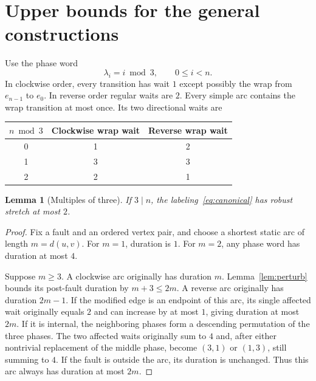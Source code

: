 \documentclass[11pt,a4paper]{article}
\newtheorem{lemma}{Lemma}
\begin{document}
\section{Upper bounds for the general constructions}
Use the phase word
\begin{equation}
 \lambda_i=i\bmod3,\qquad 0\le i<n.\label{eq:canonical}
\end{equation}
In clockwise order, every transition has wait $1$ except possibly the wrap from $e_{n-1}$ to $e_0$. In reverse order regular waits are $2$. Every simple arc contains the wrap transition at most once. Its two directional waits are
\begin{center}
\begin{tabular}{ccc}
\toprule
$n\bmod3$ & Clockwise wrap wait & Reverse wrap wait\\
\midrule
0 & 1 & 2\\
1 & 3 & 3\\
2 & 2 & 1\\
\bottomrule
\end{tabular}
\end{center}

\begin{lemma}[Multiples of three]\label{lem:upper2}
If $3\mid n$, the labeling~\eqref{eq:canonical} has robust stretch at most $2$.
\end{lemma}
\begin{proof}
Fix a fault and an ordered vertex pair, and choose a shortest static arc of length $m=d(u,v)$. For $m=1$, duration is $1$. For $m=2$, any phase word has duration at most $4$.

Suppose $m\ge3$. A clockwise arc originally has duration $m$. Lemma~\ref{lem:perturb} bounds its post-fault duration by $m+3\le2m$. A reverse arc originally has duration $2m-1$. If the modified edge is an endpoint of this arc, its single affected wait originally equals $2$ and can increase by at most $1$, giving duration at most $2m$. If it is internal, the neighboring phases form a descending permutation of the three phases. The two affected waits originally sum to $4$ and, after either nontrivial replacement of the middle phase, become $(3,1)$ or $(1,3)$, still summing to $4$. If the fault is outside the arc, its duration is unchanged. Thus this arc always has duration at most $2m$.
\end{proof}
\end{document}
